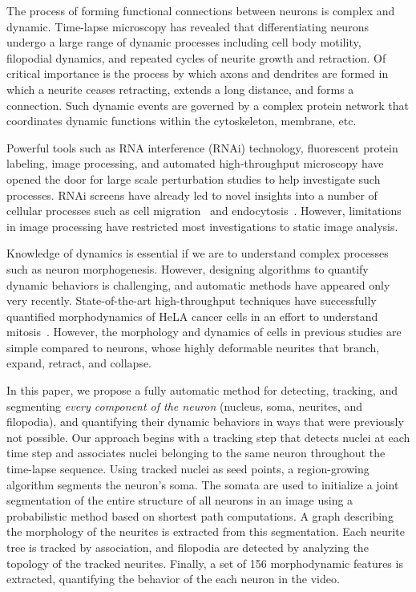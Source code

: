 

The  process  of forming  functional  connections  between neurons  is
complex  and   dynamic.   Time-lapse  microscopy   has  revealed  that
differentiating  neurons undergo  a large  range of  dynamic processes
including cell body motility, filopodial dynamics, and repeated cycles
of  neurite growth  and  retraction.  Of  critical  importance is  the
process  by which  axons and  dendrites are  formed in  which a neurite
ceases retracting, extends a   long  distance, and  forms
a connection. Such  dynamic events are  governed by a  complex protein
network that  coordinates   dynamic functions 
within the cytoskeleton, membrane, etc.

Powerful tools such as 
RNA interference  (RNAi)
technology,  fluorescent  protein   labeling,  image  processing,  and
automated high-throughput  microscopy have  opened the door  for large
scale  perturbation studies to help investigate such processes. RNAi  screens have  already led  to novel
insights   into  a  number   of  cellular   processes  such   as  cell
migration~\cite{Bakal07}  and endocytosis~\cite{Collinet10}.  However,
limitations  in  image  processing  have  restricted  most
investigations to static image analysis.

Knowledge  of dynamics is  essential if we are  to understand
complex  processes such  as neuron  morphogenesis.  However, designing
algorithms to quantify dynamic  behaviors is challenging, and
automatic methods  have appeared only  very recently. State-of-the-art
high-throughput techniques have successfully quantified morphodynamics
of  HeLA cancer  cells  in an  effort  to understand 
mitosis~\cite{Held10,Neumann10,Zhu05}.   However,  the morphology  and
dynamics of  cells in previous studies are simple compared to neurons,
whose highly deformable  neurites that branch, expand,
retract, and collapse. 

In this paper, we propose a  fully automatic method for detecting, tracking, and
segmenting {\em  every component  of the neuron}  (nucleus, soma,  neurites, and
filopodia), and quantifying their dynamic behaviors in ways that were previously
not possible. Our  approach begins with a tracking step that detects nuclei at each  time step and
associates nuclei  belonging to the  same neuron  throughout the
time-lapse sequence.
Using tracked nuclei as  seed points, a region-growing  algorithm segments
the neuron's soma.  The somata are  used to initialize a  joint segmentation of
the entire structure  of all neurons in an  image using a probabilistic
method based on  shortest path computations.  A graph  describing the morphology
of  the neurites  is extracted  from this  segmentation.  Each  neurite  tree is
tracked by association, and filopodia  are detected by analyzing the topology of
the tracked  neurites.  Finally,  a set of  156  morphodynamic  features is
extracted, quantifying the behavior of the each neuron in the video.


